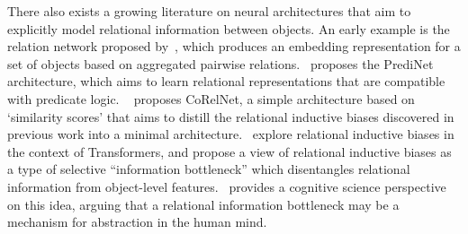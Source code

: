There also exists a growing literature on neural architectures that aim to explicitly model relational information between objects. An early example is the relation network proposed by~\citet{santoroSimpleNeural2017}, which produces an embedding representation for a set of objects based on aggregated pairwise relations.~\citet{shanahanExplicitlyRelationalNeural} proposes the PrediNet architecture, which aims to learn relational representations that are compatible with predicate logic.
~\citet{kergNeuralArchitecture2022} proposes CoRelNet, a simple architecture based on `similarity scores' that aims to distill the relational inductive biases discovered in previous work into a minimal architecture.~\citet{altabaaAbstractorsRelationalCrossattention2024,altabaa2024disentangling} explore relational inductive biases in the context of Transformers, and propose a view of relational inductive biases as a type of selective ``information bottleneck'' which disentangles relational information from object-level features.~\citet{webbRelationalBottleneckInductive2023} provides a cognitive science perspective on this idea, arguing that a relational information bottleneck may be a mechanism for abstraction in the human mind.%
